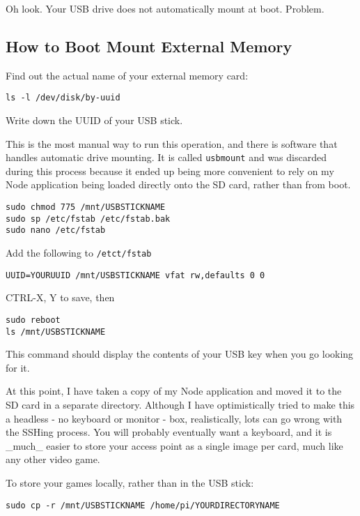 Oh look. Your USB drive does not automatically mount at boot. Problem.

\subsection{How to Boot Mount External Memory}

Find out the actual name of your external memory card:
\begin{lstlisting}
ls -l /dev/disk/by-uuid
\end{lstlisting}

Write down the UUID of your USB stick.

This is the most manual way to run this operation, and there is software that handles automatic drive mounting. It is called \texttt{usbmount} and was discarded during this process because it ended up being more convenient to rely on my Node application being loaded directly onto the SD card, rather than from boot.

\begin{lstlisting}
sudo chmod 775 /mnt/USBSTICKNAME
sudo sp /etc/fstab /etc/fstab.bak
sudo nano /etc/fstab
\end{lstlisting}

Add the following to \texttt{/etct/fstab}
\begin{lstlisting}
UUID=YOURUUID /mnt/USBSTICKNAME vfat rw,defaults 0 0
\end{lstlisting}

CTRL-X, Y to save, then
\begin{lstlisting}
sudo reboot
ls /mnt/USBSTICKNAME
\end{lstlisting}

This command should display the contents of your USB key when you go looking for it.

At this point, I have taken a copy of my Node application and moved it to the SD card in a separate directory. Although I have optimistically tried to make this a headless - no keyboard or monitor - box, realistically, lots can go wrong with the SSHing process. You will probably eventually want a keyboard, and it is _much_ easier to store your access point as a single image per card, much like any other video game.

To store your games locally, rather than in the USB stick:
\begin{lstlisting}
sudo cp -r /mnt/USBSTICKNAME /home/pi/YOURDIRECTORYNAME
\end{lstlisting}

